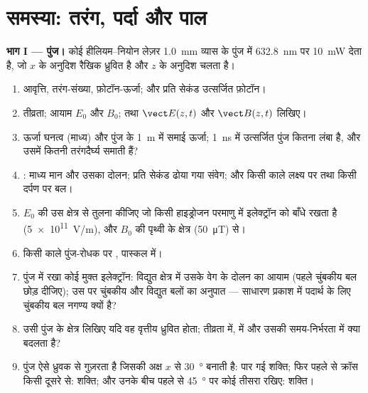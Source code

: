 \section{समस्या: तरंग, पर्दा और पाल}

\begin{problem}
\label{pb:b2:plane-waves-polarization:1}

\medskip
\noindent\textbf{भाग I --- पुंज।}
कोई हीलियम--नियोन लेज़र \qty{1.0}{mm} व्यास के पुंज में \qty{632.8}{nm} पर
\qty{10}{mW} देता है, जो $x$ के अनुदिश रैखिक ध्रुवित है और $z$ के अनुदिश
चलता है।
\begin{enumerate}
  \item आवृत्ति, तरंग-संख्या, फ़ोटॉन-ऊर्जा; और प्रति सेकंड उत्सर्जित
        फ़ोटॉन।
  \item तीव्रता; आयाम $E_0$ और $B_0$; तथा $\vect E(z, t)$ और
        $\vect B(z, t)$ लिखिए।
  \item ऊर्जा घनत्व (माध्य) और पुंज के \qty{1}{m} में समाई ऊर्जा;
        \qty{1}{ns} में उत्सर्जित पुंज कितना लंबा है, और उसमें कितनी
        तरंगदैर्घ्य समाती हैं?
  \item {}: माध्य मान और उसका दोलन; प्रति सेकंड ढोया गया
        संवेग; और किसी काले लक्ष्य पर तथा किसी दर्पण पर बल।
  \item $E_0$ की उस क्षेत्र से तुलना कीजिए जो किसी हाइड्रोजन परमाणु में
        इलेक्ट्रॉन को बाँधे रखता है (\qty{5e11}{V/m}), और $B_0$ की पृथ्वी के
        क्षेत्र (\qty{50}{\micro T}) से।
  \item किसी काले पुंज-रोधक पर , पास्कल में।
  \item पुंज में रखा कोई मुक्त इलेक्ट्रॉन: विद्युत क्षेत्र में उसके वेग के
        दोलन का आयाम (पहले चुंबकीय बल छोड़ दीजिए); उस पर चुंबकीय और
        विद्युत बलों का अनुपात --- साधारण प्रकाश में पदार्थ के लिए
        चुंबकीय बल नगण्य क्यों है?
  \item उसी पुंज के क्षेत्र लिखिए यदि वह वृत्तीय
        ध्रुवित होता; तीव्रता में,  में और उसकी
        समय-निर्भरता में क्या बदलता है?
  \item पुंज ऐसे ध्रुवक से गुज़रता है जिसकी अक्ष $x$ से
        \qty{30}{\degree} बनाती है: पार गई शक्ति; फिर पहले से क्रॉस किसी दूसरे
        से: शक्ति; और उनके बीच पहले से \qty{45}{\degree} पर कोई
        तीसरा रखिए: शक्ति।
\end{enumerate}


\end{problem}
